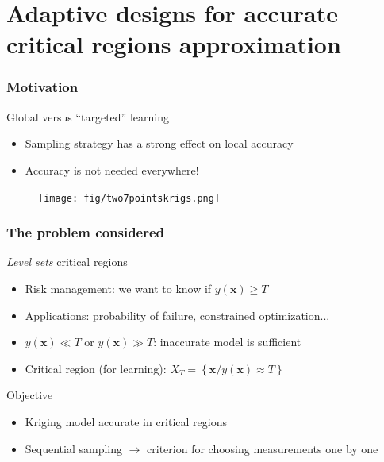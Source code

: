 \documentclass[10pt]{beamer}
\begin{document}
\section{Adaptive designs for accurate critical regions approximation}

\frame
{
\frametitle{Motivation}

\begin{block}{Global versus ``targeted'' learning}
\begin{itemize}
 \item Sampling strategy has a strong effect on local accuracy
 \item Accuracy is not needed everywhere!
\end{itemize}
\end{block}

\begin{figure}[h!] \centering	\texttt{[image: fig/two7pointskrigs.png]} \end{figure}
}

\frame
{
\frametitle{The problem considered}

\begin{block}{\textit{Level sets} critical regions}
\begin{itemize}
 \item Risk management: we want to know if $y(\mathbf{x}) \geq T$
 \item Applications: probability of failure, constrained optimization...
  \item $y(\mathbf{x}) \ll T$ or $y(\mathbf{x}) \gg T$: inaccurate model is sufficient
 \item Critical region (for learning): $X_T = \left\{ \mathbf{x} / y(\mathbf{x}) \approx T \right\}$
\end{itemize}
\end{block}

\begin{block}{Objective}
\begin{itemize}
 \item Kriging model accurate in critical regions
 \item Sequential sampling $\rightarrow$ criterion for choosing measurements one by one
\end{itemize}
\end{block}
}
\end{document}
